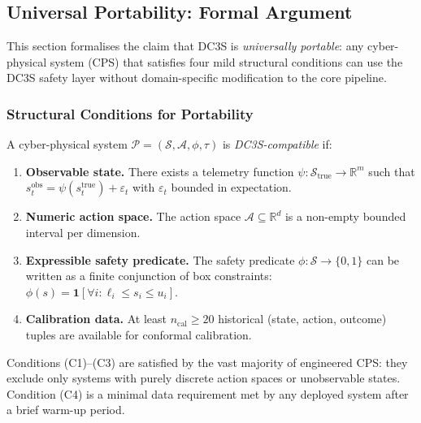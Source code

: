 
\subsection{Universal Portability: Formal Argument}
\label{sec:universal_portability}

This section formalises the claim that DC3S is \emph{universally portable}:
any cyber-physical system (CPS) that satisfies four mild structural conditions
can use the DC3S safety layer without domain-specific modification to the core
pipeline.

\subsubsection*{Structural Conditions for Portability}

\begin{definition}
\label{def:compatible_cps}
A cyber-physical system $\mathcal{P} = (\mathcal{S}, \mathcal{A}, \phi, \tau)$
is \emph{DC3S-compatible} if:
\begin{enumerate}[label=(C\arabic*)]
  \item \textbf{Observable state.} There exists a telemetry function
        $\psi: \mathcal{S}_\text{true} \to \mathbb{R}^m$ such that
        $s_t^\text{obs} = \psi(s_t^\text{true}) + \varepsilon_t$
        with $\varepsilon_t$ bounded in expectation.
  \item \textbf{Numeric action space.} The action space $\mathcal{A} \subseteq \mathbb{R}^d$
        is a non-empty bounded interval per dimension.
  \item \textbf{Expressible safety predicate.} The safety predicate
        $\phi: \mathcal{S} \to \{0,1\}$ can be written as a finite conjunction of
        box constraints: $\phi(s) = \mathbf{1}[\forall i: \ell_i \leq s_i \leq u_i]$.
  \item \textbf{Calibration data.} At least $n_\text{cal} \geq 20$ historical
        (state, action, outcome) tuples are available for conformal calibration.
\end{enumerate}
\end{definition}

Conditions (C1)--(C3) are satisfied by the vast majority of engineered CPS:
they exclude only systems with purely discrete action spaces or unobservable
states.  Condition (C4) is a minimal data requirement met by any deployed system
after a brief warm-up period.

